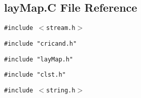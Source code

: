 \subsection{lay\-Map.C File Reference}
\label{layMap.C}
{\tt \#include $<$stream.h$>$}\par
{\tt \#include "cricand.h"}\par
{\tt \#include "lay\-Map.h"}\par
{\tt \#include "clst.h"}\par
{\tt \#include $<$string.h$>$}\par
